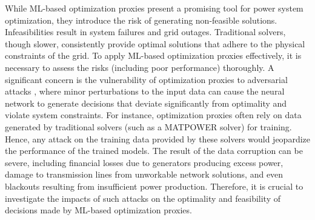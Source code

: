 While ML-based optimization proxies present a promising tool for power system optimization, they introduce the risk of generating non-feasible solutions. Infeasibilities result in system failures and grid outages.  Traditional solvers, though slower, consistently provide optimal solutions that adhere to the physical constraints of the grid. To apply ML-based optimization proxies effectively, it is necessary to assess the risks (including poor performance) thoroughly. A significant concern is the vulnerability of optimization proxies to adversarial attacks \cite{szegedy2014intrig}, where minor perturbations to the input data can cause the neural network to generate decisions that deviate significantly from optimality and violate system constraints. For instance, optimization proxies often rely on data generated by traditional solvers (such as a MATPOWER solver\cite{matpow2011}) for training. Hence, any attack on the training data provided by these solvers would jeopardize the performance of the trained models. The result of the data corruption can be severe, including financial losses due to generators producing excess power, damage to transmission lines from unworkable network solutions, and even blackouts resulting from insufficient power production. Therefore, it is crucial to investigate the impacts of such attacks on the optimality and feasibility of decisions made by ML-based optimization proxies.









